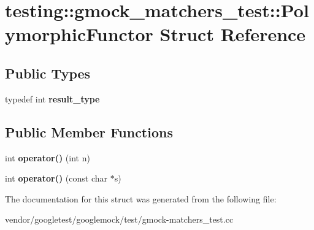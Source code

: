 \hypertarget{structtesting_1_1gmock__matchers__test_1_1_polymorphic_functor}{}\section{testing\+:\+:gmock\+\_\+matchers\+\_\+test\+:\+:Polymorphic\+Functor Struct Reference}
\label{structtesting_1_1gmock__matchers__test_1_1_polymorphic_functor}
\subsection*{Public Types}
\begin{DoxyCompactItemize}
\item 
\mbox{\label{structtesting_1_1gmock__matchers__test_1_1_polymorphic_functor_ae2b921ecae158b5eaa11a29ac6fe0cf3}} 
typedef int {\bfseries result\+\_\+type}
\end{DoxyCompactItemize}
\subsection*{Public Member Functions}
\begin{DoxyCompactItemize}
\item 
\mbox{\label{structtesting_1_1gmock__matchers__test_1_1_polymorphic_functor_a2fb8b012acd2ccd52788231036877c98}} 
int {\bfseries operator()} (int n)
\item 
\mbox{\label{structtesting_1_1gmock__matchers__test_1_1_polymorphic_functor_aee4d200c7f85ce4d8048d1798a511002}} 
int {\bfseries operator()} (const char $\ast$s)
\end{DoxyCompactItemize}


The documentation for this struct was generated from the following file\+:\begin{DoxyCompactItemize}
\item 
vendor/googletest/googlemock/test/gmock-\/matchers\+\_\+test.\+cc\end{DoxyCompactItemize}
